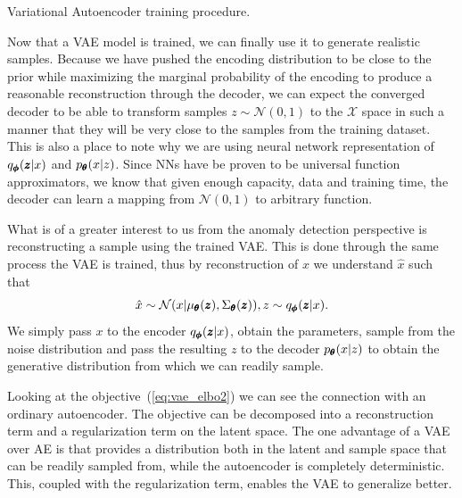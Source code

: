 \begin{algorithm}
\caption{Variational Autoencoder training procedure.}
\label{alg:vae_train}
\end{algorithm}

Now that a VAE model is trained, we can finally use it to generate
realistic samples. Because we have pushed the encoding distribution
to be close to the prior while maximizing the marginal probability
of the encoding to produce a reasonable reconstruction through the
decoder, we can expect the converged decoder to be able to transform
samples $z\sim\mathcal{N}(0,1)$ to the $\mathcal{X}$ space in such
a manner that they will be very close to the samples from the training
dataset. This is also a place to note why we are using neural network
representation of $q_{\pmb{{\phi}}}(\pmb{{z}}|x)$ and $p_{\pmb{{\theta}}}(x|z)$. Since NNs
have be proven to be universal function approximators, we know that
given enough capacity, data and training time, the decoder can learn
a mapping from $\mathcal{N}(0,1)$ to arbitrary function.

What is of a greater interest to us from the anomaly detection perspective
is reconstructing a sample using the trained VAE. This is done through
the same process the VAE is trained, thus by reconstruction of $x$
we understand $\hat{x}$ such that
\begin{equation}
\hat{x}\sim\mathcal{N}(x|\mu_{\pmb{{\theta}}}(\pmb{{z}}),\Sigma_{\pmb{{\theta}}}(\pmb{{z}})),z\sim q_{\pmb{{\phi}}}(\pmb{{z}}|x).
\end{equation}
We simply pass $x$ to the encoder $q_{\pmb{{\phi}}}(\pmb{{z}}|x)$, obtain the parameters,
sample from the noise distribution and pass the resulting $z$ to
the decoder $p_{\pmb{{\theta}}}(x|z)$ to obtain the generative distribution
from which we can readily sample.

Looking at the objective~(\ref{eq:vae_elbo2}) we can see the connection
with an ordinary autoencoder. The objective can be decomposed into
a reconstruction term and a regularization term on the latent space.
The one advantage of a VAE over AE is that provides a distribution
both in the latent and sample space that can be readily sampled from,
while the autoencoder is completely deterministic. This, coupled with
the regularization term, enables the VAE to generalize better.

